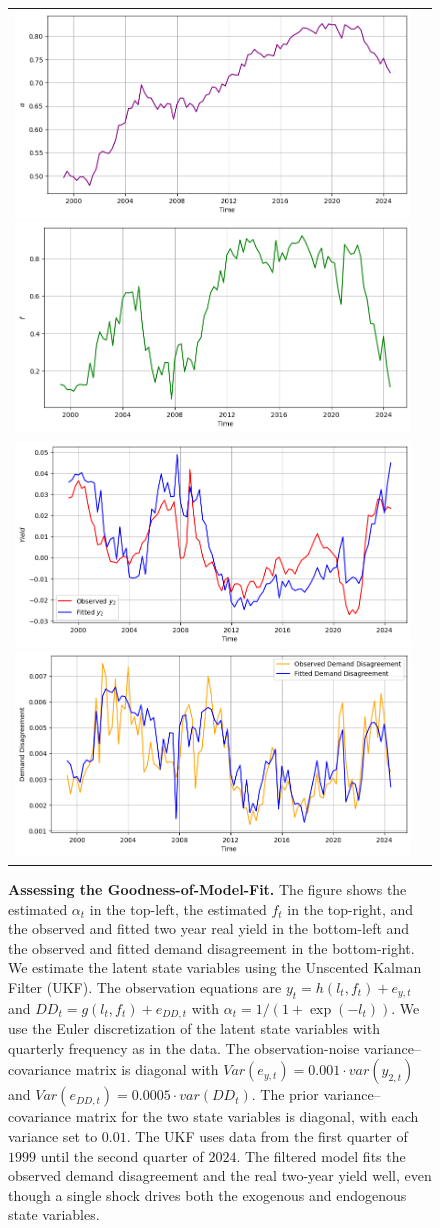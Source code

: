 \documentclass[preprint,11pt,authoryear]{elsarticle}
\theoremstyle{plain}
\begin{document}
\begin{figure}[htbp]
\centering
\begin{tabular}{cc}
\includegraphics[width=.45\textwidth]{figures/alphaFilter.png} 
\includegraphics[width=.45\textwidth]{figures/ffilter.png} \\ 
\includegraphics[width=.45\textwidth]{figures/yieldfilter.png} 
\includegraphics[width=.45\textwidth]{figures/DDfilter.png} \\ 
\end{tabular}
\caption{\textbf{Assessing the Goodness-of-Model-Fit.} The figure shows the estimated $\alpha_t$ in the top-left, the estimated $f_t$ in the top-right, and the observed and fitted two year real yield in the bottom-left and the observed and fitted demand disagreement in the bottom-right. We estimate the latent state variables using the Unscented Kalman Filter (UKF). The observation equations are $y_t = h(l_t, f_t) + e_{y,t}$ and $DD_t = g(l_t,f_t) + e_{DD,t}$ with $\alpha_t = 1/(1+\exp(-l_t))$.  We use the Euler discretization of the latent state variables with quarterly frequency as in the data. The observation-noise variance–covariance matrix is diagonal with $Var(e_{y,t}) = 0.001 \cdot var(y_{2,t})$ and $Var(e_{DD,t}) = 0.0005 \cdot  var(DD_t)$. The prior variance–covariance matrix for the two state variables is diagonal, with each variance set to $0.01$. The UKF uses data from the first quarter of $1999$ until the second quarter of $2024$. The filtered model fits the observed demand disagreement and the real two-year yield well, even though a single shock drives both the exogenous and endogenous state variables.}  \label{fig:UKFalphaandf}
\end{figure}
\end{document}
